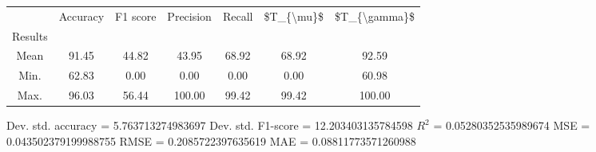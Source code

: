 \begin{tabular}{|c|c|c|c|c|c|c|}
\toprule
{} &  Accuracy &  F1 score &  Precision &  Recall &  \$T\_\{\textbackslash mu\}\$ &  \$T\_\{\textbackslash gamma\}\$ \\
Results &           &           &            &         &            &               \\
\hline
Mean    &     91.45 &     44.82 &      43.95 &   68.92 &      68.92 &         92.59 \\
Min.    &     62.83 &      0.00 &       0.00 &    0.00 &       0.00 &         60.98 \\
Max.    &     96.03 &     56.44 &     100.00 &   99.42 &      99.42 &        100.00 \\
\bottomrule
\end{tabular}

 Dev. std. accuracy = 5.763713274983697
 Dev. std. F1-score = 12.203403135784598
 $R^2$ = 0.05280352535989674
 MSE = 0.043502379199988755
 RMSE = 0.2085722397635619
 MAE = 0.08811773571260988